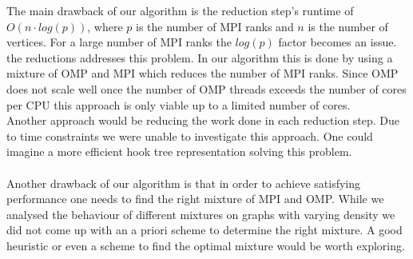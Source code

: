 The main drawback of our algorithm is the reduction step's runtime of $O\left(n \cdot log\left(p\right)\right)$, where $p$ is the number of MPI ranks and $n$ is the number of vertices. For a large number of MPI ranks the $log\left(p\right)$ factor becomes an issue.\\
 the reductions  addresses this problem. In our algorithm this is done by using a mixture of OMP and MPI which reduces the number of MPI ranks. Since OMP does not scale well once the number of OMP threads exceeds the number of cores per CPU this approach is only viable up to a limited number of cores.\\
Another approach would be reducing the work  done in each reduction step. Due to time constraints we were unable to investigate this approach. One could imagine a more efficient hook tree representation solving this problem.\\
\\
Another drawback of our algorithm is that in order to achieve satisfying performance one needs to find the right mixture of MPI and OMP. While we analysed the behaviour of different mixtures on graphs with varying density we did not come up with an a priori scheme to determine the right mixture. A good heuristic or even a scheme to find the optimal mixture would be worth exploring.